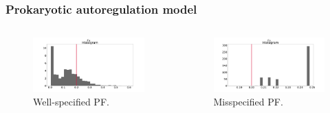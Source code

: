 \documentclass{beamer}
\begin{document}
    \begin{frame}
    \frametitle{Prokaryotic autoregulation model}
    \begin{columns}
        \begin{column}{0.45\textwidth}
            \begin{figure}
                \centering
                \includegraphics[width=\columnwidth]{images/ar_pf_g1}
                \caption{Well-specified PF.}
            \end{figure}
        \end{column}
        \begin{column}{0.45\textwidth}
            \begin{figure}
                \centering
                \includegraphics[width=\columnwidth]{images/ar_pf_c1}
                \caption{Misspecified PF.}
            \end{figure}
        \end{column}
    \end{columns}
    

\end{frame}
\end{document}
